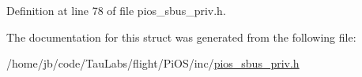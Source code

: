 \-Definition at line 78 of file pios\-\_\-sbus\-\_\-priv.\-h.



\-The documentation for this struct was generated from the following file\-:\begin{DoxyCompactItemize}
\item 
/home/jb/code/\-Tau\-Labs/flight/\-Pi\-O\-S/inc/\hyperlink{pios__sbus__priv_8h}{pios\-\_\-sbus\-\_\-priv.\-h}\end{DoxyCompactItemize}
